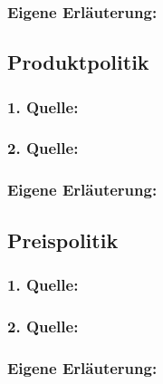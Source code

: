         \subsubsection*{Eigene Erläuterung:}
        \begin{abstract}
        \end{abstract}
    \subsection{Produktpolitik}
        \subsubsection*{1. Quelle:}
        \begin{abstract}
        \end{abstract}
        \subsubsection*{2. Quelle:}
        \begin{abstract}
        \end{abstract}
        \subsubsection*{Eigene Erläuterung:}
        \begin{abstract}
        \end{abstract}
    \subsection{Preispolitik}
        \subsubsection*{1. Quelle:}
        \begin{abstract}
        \end{abstract}
        \subsubsection*{2. Quelle:}
        \begin{abstract}
        \end{abstract}
        \subsubsection*{Eigene Erläuterung:}
        \begin{abstract}
        \end{abstract}
